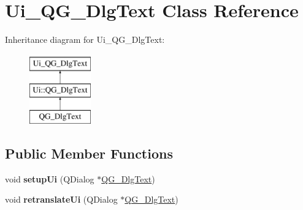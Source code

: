 \hypertarget{classUi__QG__DlgText}{\section{Ui\-\_\-\-Q\-G\-\_\-\-Dlg\-Text Class Reference}
\label{classUi__QG__DlgText}
}
Inheritance diagram for Ui\-\_\-\-Q\-G\-\_\-\-Dlg\-Text\-:\begin{figure}[H]
\begin{center}
\leavevmode
\includegraphics[height=3.000000cm]{classUi__QG__DlgText}
\end{center}
\end{figure}
\subsection*{Public Member Functions}
\begin{DoxyCompactItemize}
\item 
\hypertarget{classUi__QG__DlgText_a073c665baa2d7fb8bbf0a82ce1bf7ff6}{void {\bfseries setup\-Ui} (Q\-Dialog $\ast$\hyperlink{classQG__DlgText}{Q\-G\-\_\-\-Dlg\-Text})}\label{classUi__QG__DlgText_a073c665baa2d7fb8bbf0a82ce1bf7ff6}

\item 
\hypertarget{classUi__QG__DlgText_a463360ae0d0d4ff2d0621c3be4cda9e0}{void {\bfseries retranslate\-Ui} (Q\-Dialog $\ast$\hyperlink{classQG__DlgText}{Q\-G\-\_\-\-Dlg\-Text})}\label{classUi__QG__DlgText_a463360ae0d0d4ff2d0621c3be4cda9e0}

\end{DoxyCompactItemize}
